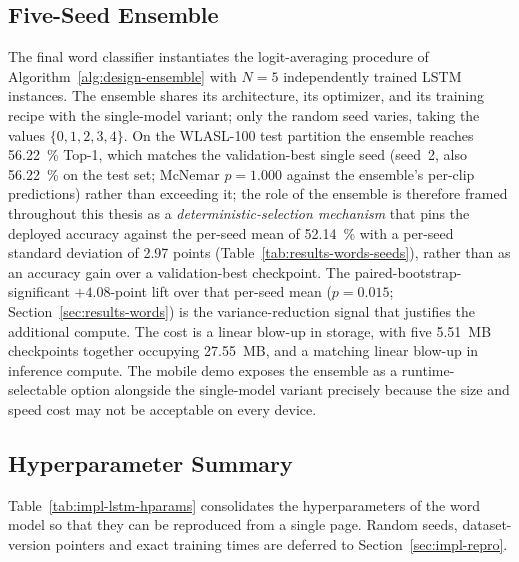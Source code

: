 \subsection{Five-Seed Ensemble}
\label{sec:impl-lstm-ensemble}

The final word classifier instantiates the logit-averaging procedure
of Algorithm~\ref{alg:design-ensemble} with $N = 5$ independently
trained LSTM instances. The ensemble shares its architecture, its
optimizer, and its training recipe with the single-model variant;
only the random seed varies, taking the values $\{0, 1, 2, 3, 4\}$.
On the WLASL-100 test partition the ensemble reaches
\SI{56.22}{\percent} Top-1, which matches the validation-best single
seed (seed~2, also \SI{56.22}{\percent} on the test set; McNemar
$p = 1.000$ against the ensemble's per-clip predictions) rather
than exceeding it; the role of the ensemble is therefore framed
throughout this thesis as a
\emph{deterministic-selection mechanism} that pins the deployed
accuracy against the per-seed mean of \SI{52.14}{\percent} with a
per-seed standard deviation of \num{2.97} points
(Table~\ref{tab:results-words-seeds}), rather than as an accuracy
gain over a validation-best checkpoint. The
paired-bootstrap-significant $+4.08$-point lift over that per-seed
mean ($p = 0.015$; Section~\ref{sec:results-words}) is the
variance-reduction signal that justifies the additional compute.
The cost is a linear blow-up in storage, with five 5.51~MB
checkpoints together occupying 27.55~MB, and a matching linear
blow-up in inference compute. The mobile demo exposes the ensemble
as a runtime-selectable option alongside the single-model variant
precisely because the size and speed cost may not be acceptable on
every device.

\subsection{Hyperparameter Summary}
\label{sec:impl-lstm-hparams}

Table~\ref{tab:impl-lstm-hparams} consolidates the hyperparameters
of the word model so that they can be reproduced from a single page.
Random seeds, dataset-version pointers and exact training times are
deferred to Section~\ref{sec:impl-repro}.

